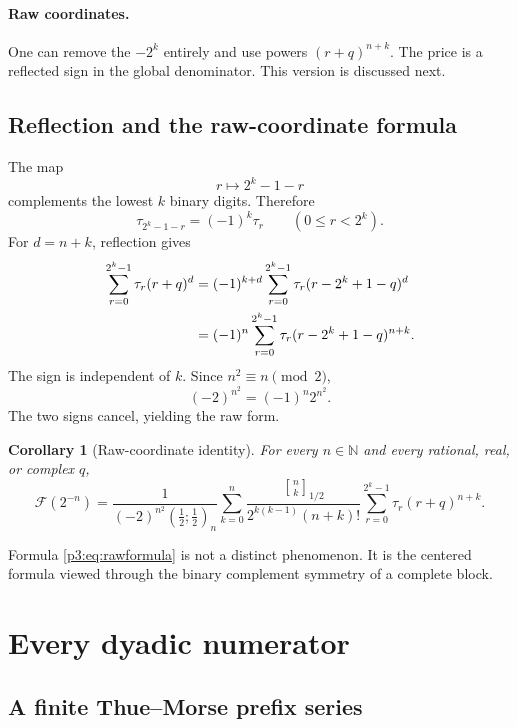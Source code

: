 \documentclass[11pt,oneside]{article}
\newtheorem{corollary}[theorem]{Corollary}
\theoremstyle{definition}
\theoremstyle{remark}
\newcommand{\qpoch}[3]{\left(#1;#2\right)_{#3}}
\newcommand{\halfqbinom}[2]{{\genfrac{[}{]}{0pt}{}{#1}{#2}}_{1/2}}
\newcommand{\F}{\mathcal F}
\newcommand{\N}{\mathbb N}
\newcommand{\tm}{\tau}
\begin{document}
\paragraph{Raw coordinates.}
One can remove the $-2^k$ entirely and use powers $(r+q)^{n+k}$.  The price
is a reflected sign in the global denominator.  This version is discussed
next.

\subsection{Reflection and the raw-coordinate formula}

The map
\[
 r\longmapsto 2^k-1-r
\]
complements the lowest $k$ binary digits.  Therefore
\begin{equation}\label{p3:eq:tmreflection}
 \tm_{2^k-1-r}=(-1)^k\tm_r
 \qquad(0\le r<2^k).
\end{equation}
For $d=n+k$, reflection gives
\begin{align}
 \sum_{r=0}^{2^k-1}\tm_r(r+q)^d
 &=(-1)^{k+d}
   \sum_{r=0}^{2^k-1}\tm_r
   (r-2^k+1-q)^d\notag\\
 &=(-1)^n
   \sum_{r=0}^{2^k-1}\tm_r
   (r-2^k+1-q)^{n+k}.\label{p3:eq:rawreflection}
\end{align}
The sign is independent of $k$.  Since $n^2\equiv n\pmod2$,
\[
 (-2)^{n^2}=(-1)^n2^{n^2}.
\]
The two signs cancel, yielding the raw form.

\begin{corollary}[Raw-coordinate identity]\label{p3:cor:rawformula}
For every $n\in\N$ and every rational, real, or complex $q$,
\begin{equation}\label{p3:eq:rawformula}
 \boxed{
 \F(2^{-n})=
 \frac{1}{(-2)^{n^2}\qpoch{\frac12}{\frac12}{n}}
 \sum_{k=0}^{n}
 \frac{\halfqbinom{n}{k}}
      {2^{k(k-1)}(n+k)!}
 \sum_{r=0}^{2^k-1}\tm_r(r+q)^{n+k}.}
\end{equation}
\end{corollary}

Formula \eqref{p3:eq:rawformula} is not a distinct phenomenon.  It is the
centered formula viewed through the binary complement symmetry of a complete
block.

\section{Every dyadic numerator}\label{p3:sec:arbitrarym}

\subsection{A finite Thue--Morse prefix series}
\end{document}
